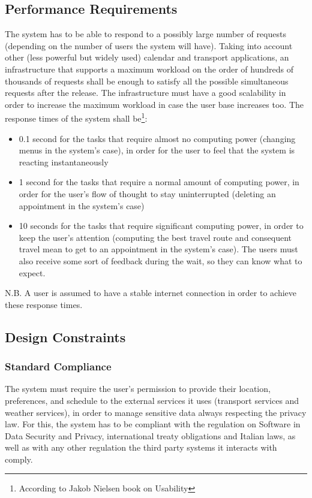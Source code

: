 \documentclass[12pt]{article}
\begin{document}
\subsection{Performance Requirements}
The system has to be able to respond to a possibly large number of requests (depending on the number of users the system will have). Taking into account other (less powerful but widely used) calendar and transport applications, an infrastructure that supports a maximum workload on the order of hundreds of thousands of requests shall be enough to satisfy all the possible simultaneous requests after the release. The infrastructure must have a good scalability in order to increase the maximum workload in case the user base increases too. The response times of the system shall be\footnote{According to Jakob Nielsen book on Usability}:
\begin{itemize}
    \item 0.1 second for the tasks that require almost no computing power (changing menus in the system's case), in order for the user to feel that the system is reacting instantaneously
    \item 1 second for the tasks that require a normal amount of computing power, in order for the user's flow of thought to stay uninterrupted (deleting an appointment in the system's case)
    \item 10 seconds for the tasks that require significant computing power, in order to keep the user's attention (computing the best travel route and consequent travel mean to get to an appointment in the system's case). The users must also receive some sort of feedback during the wait, so they can know what to expect.
\end{itemize}
N.B. A user is assumed to have a stable internet connection in order to achieve these response times.


\subsection{Design Constraints}
\subsubsection{Standard Compliance}
The system must require the user's permission to provide their location, preferences, and schedule to the external services it uses (transport services and weather services), in order to manage sensitive data always respecting the privacy law. For this, the system has to be compliant with the regulation on Software in Data Security and Privacy, international treaty obligations and Italian laws, as well as with any other regulation the third party systems it interacts with comply.
\end{document}
